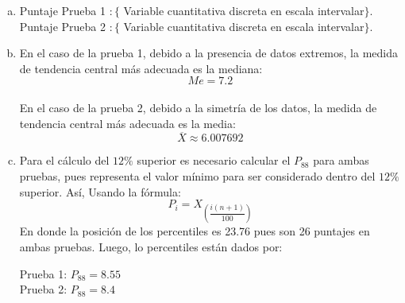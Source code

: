 \begin{solution}
\begin{enumerate}[a)]
\item Puntaje Prueba 1 $:\{$ Variable cuantitativa discreta en escala intervalar$\}$. \\
Puntaje Prueba 2 $:\{$ Variable cuantitativa discreta en escala intervalar$\}$.  \\

\item En el caso de la prueba 1, debido a la presencia de datos extremos, la medida de tendencia central más adecuada es la mediana:  $$Me=7.2$$ \\
En el caso de la prueba 2, debido a la simetría de los datos, la medida de tendencia central más adecuada es la media: $$\overline{X}\approx 6.007692$$ 
\item Para el cálculo del $12\%$ superior es necesario calcular el $P_{88}$ para ambas pruebas, pues representa el valor mínimo para ser considerado dentro del $12\%$ superior. Así, Usando la fórmula:
$$P_i=X_{\left(\dfrac{i(n+1)}{100}\right)}$$
En donde la posición de los percentiles es 23.76 pues son 26 puntajes en ambas pruebas. Luego, lo percentiles están dados por:
\begin{center}
Prueba 1: $P_{88}= 8.55$ \\
Prueba 2: $P_{88}= 8.4$ 
\end{center}
\end{enumerate}
\end{solution}